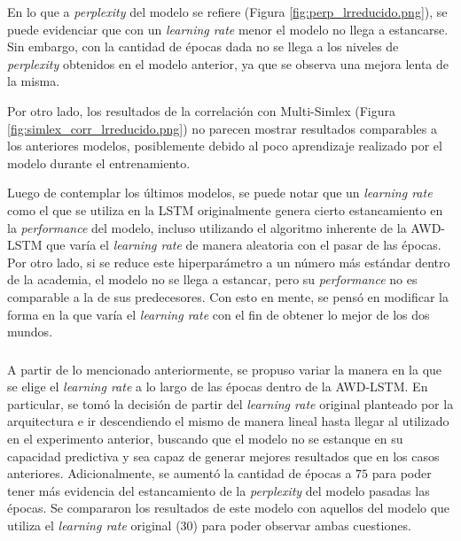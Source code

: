 En lo que a \textit{perplexity} del modelo se refiere (Figura \ref{fig:perp_lrreducido.png}), se puede evidenciar que con un 
\textit{learning rate} menor el modelo no llega a estancarse. Sin embargo, con la cantidad de 
épocas dada no se llega a los niveles de \textit{perplexity} obtenidos en el modelo anterior, 
ya que se observa una mejora lenta de la misma.

Por otro lado, los resultados de la correlación con Multi-Simlex (Figura \ref{fig:simlex_corr_lrreducido.png}) no parecen 
mostrar resultados comparables a los anteriores modelos, posiblemente debido al poco 
aprendizaje realizado por el modelo durante el entrenamiento.


Luego de contemplar los últimos modelos, se puede notar que un \textit{learning rate} como el que 
se utiliza en la LSTM originalmente genera cierto estancamiento en la \textit{performance} del 
modelo, incluso utilizando el algoritmo inherente de la AWD-LSTM que varía el 
\textit{learning rate} de manera aleatoria con el pasar de las épocas. Por otro lado, si 
se reduce este hiperparámetro a un número más estándar dentro de la academia, el 
modelo no se llega a estancar, pero su \textit{performance} no es comparable a la de sus 
predecesores. Con esto en mente, se pensó en modificar la forma en la que varía 
el \textit{learning rate} con el fin de obtener lo mejor de los dos mundos.

\subsubsection{}

A partir de lo mencionado anteriormente, se propuso variar la manera en la que se elige 
el \textit{learning rate} a lo largo de las épocas dentro de la AWD-LSTM. En particular, se tomó 
la decisión de partir del \textit{learning rate} original planteado por la arquitectura e ir 
descendiendo el mismo de manera lineal hasta llegar al utilizado en el experimento 
anterior, buscando que el modelo no se estanque en su capacidad predictiva y sea 
capaz de generar mejores resultados que en los casos anteriores. Adicionalmente, 
se aumentó la cantidad de épocas a $75$ para poder tener más evidencia del estancamiento 
de la \textit{perplexity} del modelo pasadas las épocas. Se compararon los resultados de este modelo con aquellos del modelo que utiliza 
el \textit{learning rate} original ($30$) para poder observar ambas cuestiones.


